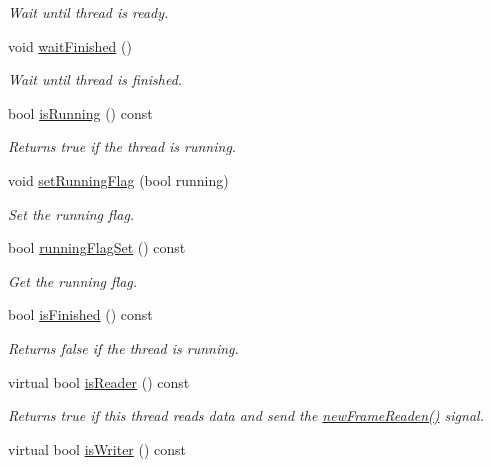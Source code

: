 \begin{DoxyCompactItemize}
\begin{DoxyCompactList}\small\item\em Wait until thread is ready. \end{DoxyCompactList}\item 
void \hyperlink{classmdt_port_thread_a621c0748a16bc9ee15983ef488314c85}{wait\-Finished} ()
\begin{DoxyCompactList}\small\item\em Wait until thread is finished. \end{DoxyCompactList}\item 
bool \hyperlink{classmdt_port_thread_ae1becf17263dd9fbf5dfcc6c51eddd72}{is\-Running} () const 
\begin{DoxyCompactList}\small\item\em Returns true if the thread is running. \end{DoxyCompactList}\item 
void \hyperlink{classmdt_port_thread_ad9bcfaa66fba25512f2677a7e320c6c8}{set\-Running\-Flag} (bool running)
\begin{DoxyCompactList}\small\item\em Set the running flag. \end{DoxyCompactList}\item 
bool \hyperlink{classmdt_port_thread_abce96e61e09780841b729f28ab9054f0}{running\-Flag\-Set} () const 
\begin{DoxyCompactList}\small\item\em Get the running flag. \end{DoxyCompactList}\item 
bool \hyperlink{classmdt_port_thread_a55d7ef615447823bf9878492a2c88fd4}{is\-Finished} () const 
\begin{DoxyCompactList}\small\item\em Returns false if the thread is running. \end{DoxyCompactList}\item 
virtual bool \hyperlink{classmdt_port_thread_acdb3d96287c571cc08ef39860dc324b1}{is\-Reader} () const 
\begin{DoxyCompactList}\small\item\em Returns true if this thread reads data and send the \hyperlink{classmdt_port_thread_a7fc2245c753fd65e1beffec211c41461}{new\-Frame\-Readen()} signal. \end{DoxyCompactList}\item 
virtual bool \hyperlink{classmdt_port_thread_a0122a12262052cf3643241a3eaa31c58}{is\-Writer} () const 

\end{DoxyCompactItemize}
